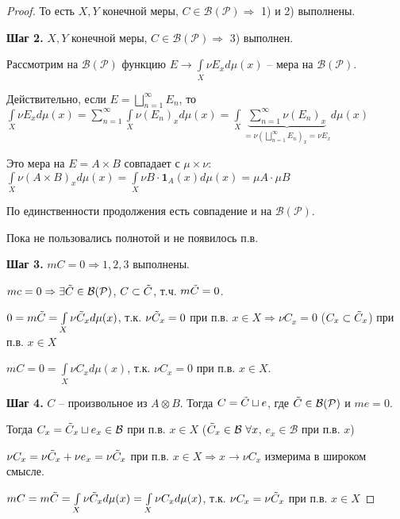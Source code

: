 \begin{proof}
    То есть $X, Y$ конечной меры, $C\in \mathcal{B}(\mathcal{P})\Rightarrow$ 1) и 2) выполнены.

    \textbf{Шаг 2.} $X, Y$ конечной меры, $C\in \mathcal{B}(\mathcal{P})\Rightarrow$ 3) выполнен.

    Рассмотрим на $\mathcal{B}(\mathcal{P})$ функцию $E\rightarrow \int\limits_X \nu E_x d\mu (x)$ – мера на $\mathcal{B}(\mathcal{P})$.

    Действительно, если $E=\bigsqcup\limits_{n=1}^\infty E_n$, то $\int\limits_X \nu E_x d\mu (x)=\sum\limits_{n=1}^\infty\int\limits_X \nu (E_n)_x d\mu (x)
    = \int\limits_X\underbrace{\sum\limits_{n=1}^\infty \nu (E_n)_x}_{=\nu (\bigsqcup\limits_{n=1}^\infty E_n)_x=\nu E_x}d\mu (x)$

    Это мера на $E=A\times B$ совпадает с $\mu \times \nu$: $\int\limits_X\nu (A\times B)_x d\mu (x) =
    \int\limits_X \nu B\cdot \mathbf{1}_A(x) d\mu (x)=\mu A\cdot \mu B$

    По единственности продолжения есть совпадение и на $\mathcal{B}(\mathcal{P})$.

    \begin{remark}
        Пока не пользовались полнотой и не появилось п.в.
    \end{remark}

    \textbf{Шаг 3.} $mC = 0\Rightarrow 1, 2, 3$ выполнены.

    $mc=0\Rightarrow \exists \Tilde{C}\in \mathcal{B}(\mathcal{P})$, $C\subset \Tilde{C}$, т.ч. $m\Tilde{C} = 0$.

    $0=m\Tilde{C}=\int\limits_X \nu \Tilde{C}_x d\mu (x)$, т.к. $\nu \Tilde{C}_x=0$ при п.в. $x\in X\Rightarrow
    \nu C_x = 0$ ($C_x\subset \Tilde{C}_x$) при п.в. $x\in X$

    $mC = 0 =\int\limits_X \nu C_x d\mu (x)$, т.к. $\nu C_x=0$ при п.в. $x\in X$.

    \textbf{Шаг 4.} $C$ – произвольное из $A\otimes B$. Тогда $C=\Tilde{C}\sqcup e$, где $\Tilde{C} \in \mathcal{B}(\mathcal{P})$ 
    и $me = 0$.

    Тогда $C_x =\Tilde{C}_x\sqcup e_x\in \mathcal{B}$ при п.в. $x\in X$ ($\Tilde{C}_x\in \mathcal{B}\ \forall x$, $e_x\in \mathcal{B}$
    при п.в. $x$)

    $\nu C_x = \nu \Tilde{C}_x + \nu e_x= \nu \Tilde{C}_x$ при п.в. $x\in X \Rightarrow x\rightarrow \nu C_x$ измерима в широком смысле.

    $mC = m\Tilde{C}=\int\limits_X \nu \Tilde{C}_x d\mu (x)=\int\limits_X \nu C_x d\mu (x)$, т.к. $\nu C_x = \nu \Tilde{C}_x$ при п.в. $x\in X$


\end{proof}
